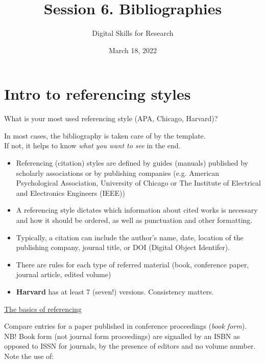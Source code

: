 \documentclass[a4paper,11pt]{article}
\title{Session 6. Bibliographies}
\author{Digital Skills for Research}
\date{March 18, 2022}
\begin{document}
	
\clearpage
\maketitle
\thispagestyle{empty}

\tableofcontents

\section{Intro to referencing styles}

\begin{tcolorbox}[colback=red!5!white, colframe=red!75!black]
	\centering
	{\Large{What is your most used referencing style (APA, Chicago, Harvard)?}}
\end{tcolorbox}
\bigskip
In most cases, the bibliography is taken care of by the template. \\
If not, it helps to know \emph{what you want to see} in the end. 
\bigskip

\begin{itemize}
	\item Referencing (citation) styles are defined by guides (manuals) published by scholarly associations or by publishing companies (e.g. American Psychological Association, University of Chicago or The Institute of Electrical and Electronics Engineers (IEEE))
	\item A referencing style dictates which information about cited works is necessary and how it should be ordered, as well as punctuation and other formatting.
	\item Typically, a citation can include the author's name, date, location of the publishing company, journal title, or DOI (Digital Object Identifer).
	\item There are rules for each type of referred material (book, conference paper, journal article, edited volume)
	\item \textbf{Harvard} has at least 7 (seven!) versions. Consistency matters. 
\end{itemize}

\href{https://www.citethemrightonline.com/Basics}{\underline{The basics of referencing}}

\medskip

Compare entries for a paper published in conference proceedings (\emph{book form}).\\
NB! Book form (not journal form proceedings) are signalled by an ISBN as opposed to  ISSN for journals, by the presence of editors and no volume number.\\
\medskip
Note the use of:
\end{document}
